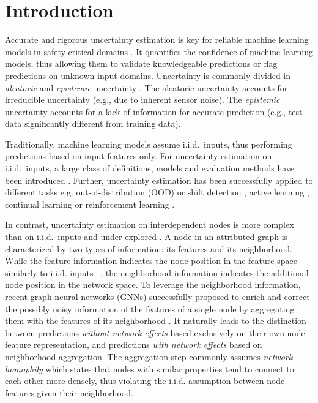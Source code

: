 \section{Introduction}
\label{sec:introduction_009}

Accurate and rigorous uncertainty estimation is key for reliable machine learning models in safety-critical domains \cite{interpretable-ml}. It quantifies the confidence of machine learning models, thus allowing them to validate knowledgeable predictions or flag predictions on unknown input domains. Uncertainty is commonly divided in \emph{aleatoric} and \emph{epistemic} uncertainty \cite{dropout}. The aleatoric uncertainty accounts for irreducible uncertainty (e.g., due to inherent sensor noise). The \emph{epistemic} uncertainty accounts for a lack of information for accurate prediction (e.g., test data significantly different from training data).

Traditionally, machine learning models assume i.i.d.\ inputs, thus performing predictions based on input features only. For uncertainty estimation on i.i.d.\ inputs, a large class of definitions, models and evaluation methods have been introduced \citep{dropout, Malinin2017, review-uncertainty-dl, dataset-shift, robustness-uncertainty-dirichlet}. Further, uncertainty estimation has been successfully applied to different tasks e.g. out-of-distribution (OOD) or shift detection \citep{dataset-shift}, active learning \cite{uncertainty-meta-learning, bayesian-meta-learning}, continual learning \citep{uncertainty-continual-learning} or reinforcement learning \citep{uncertainty-rl}. 

In contrast, uncertainty estimation on interdependent nodes is more complex than on i.i.d.\ inputs and under-explored \citep{review-uncertainty-dl}. A node in an attributed graph is characterized by two types of information: its features and its neighborhood. While the feature information indicates the node position in the feature space -- similarly to i.i.d. inputs --, the neighborhood information indicates the additional node position in the network space. To leverage the neighborhood information, recent graph neural networks (GNNs) successfully proposed to enrich and correct the possibly noisy information of the features of a single node by aggregating them with the features of its neighborhood \cite{Kipf2016, Velickovic2017, Klicpera2018}. It naturally leads to the distinction between predictions \emph{without network effects} based exclusively on their own node feature representation, and predictions \emph{with network effects} based on neighborhood aggregation. The aggregation step commonly assumes \emph{network homophily} which states that nodes with similar properties tend to connect to each other more densely, thus violating the i.i.d. assumption between node features given their neighborhood. 

